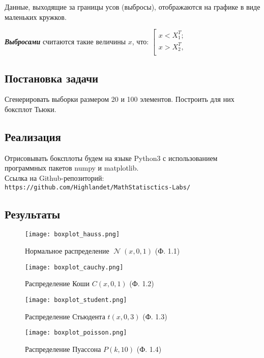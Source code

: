 \documentclass[14pt]{extarticle}
\DeclareMathOperator{\normal}{\mathcal{N}} %
\begin{document}
Данные, выходящие за границы усов (выбросы), отображаются на графике в виде маленьких кружков.

\textbf{\textit{Выбросами}} считаются такие величины \(x\), что: 
$\left[ 
      \begin{gathered} 
        x < X_1^T; \\ 
        x > X_2^T, \\ 
      \end{gathered} 
\right.$

\subsection{Постановка задачи}

Сгенерировать выборки размером 20 и 100 элементов. Построить для них боксплот Тьюки.

\subsection{Реализация}

Отрисовывать боксплоты будем на языке Python3 с использованием программных пакетов numpy и matplotlib.\\
Ссылка на Github-репозиторий:\\
\texttt{https://github.com/Highlandet/MathStatisctics-Labs/}

\subsection{Результаты}

\begin{figure}[H]
    \centering
    \texttt{[image: boxplot\_hauss.png]}
    \caption{Нормальное распределение \(\normal(x, 0, 1)\) (Ф. 1.1)}
    \label{fig:enter-label}
\end{figure}

\begin{figure}[H]
    \centering
    \texttt{[image: boxplot\_cauchy.png]}
    \caption{Распределение Коши \(C(x, 0, 1)\) (Ф. 1.2)}
    \label{fig:enter-label}
\end{figure}

\begin{figure}[H]
    \centering
    \texttt{[image: boxplot\_student.png]}
    \caption{Распределение Стьюдента \(t(x, 0, 3)\) (Ф. 1.3)}
    \label{fig:enter-label}
\end{figure}

\begin{figure}[H]
    \centering
    \texttt{[image: boxplot\_poisson.png]}
    \caption{Распределение Пуассона \(P(k, 10)\) (Ф. 1.4)}
    \label{fig:enter-label}
\end{figure}
\end{document}
